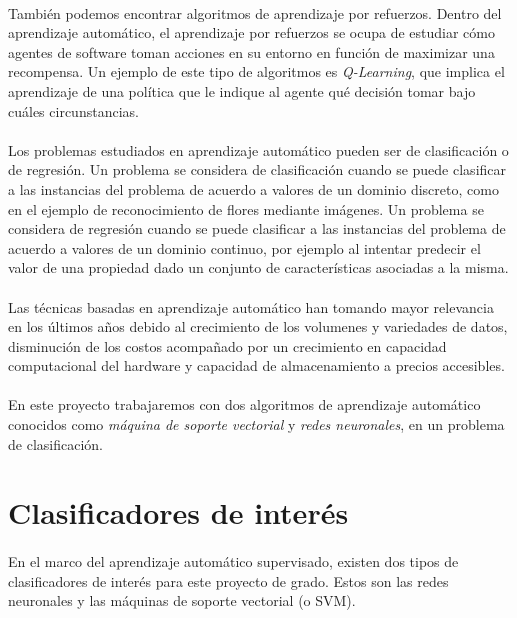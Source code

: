 \paragraph{}También podemos encontrar algoritmos de aprendizaje por refuerzos. Dentro del aprendizaje automático, el aprendizaje por refuerzos se ocupa de estudiar cómo agentes de software toman acciones en su entorno en función de maximizar una recompensa. Un ejemplo de este tipo de algoritmos es \textit{Q-Learning}, que implica el aprendizaje de una política que le indique al agente qué decisión tomar bajo cuáles circunstancias.

\paragraph{}Los problemas estudiados en aprendizaje automático pueden ser de clasificación o de regresión. Un problema se considera de clasificación cuando se puede clasificar a las instancias del problema de acuerdo a valores de un dominio discreto, como en el ejemplo de reconocimiento de flores mediante imágenes. Un problema se considera de regresión cuando se puede clasificar a las instancias del problema de acuerdo a valores de un dominio continuo, por ejemplo al intentar predecir el valor de una propiedad dado un conjunto de características asociadas a la misma.

\paragraph{}Las técnicas basadas en aprendizaje automático han tomando mayor relevancia en los últimos años debido al crecimiento de los volumenes y variedades de datos, disminución de los costos acompañado por un crecimiento en capacidad computacional del hardware y capacidad de almacenamiento a precios accesibles. 

\paragraph{}En este proyecto trabajaremos con dos algoritmos de aprendizaje automático conocidos como \textit{máquina de soporte vectorial} y \textit{redes neuronales}, en un problema de clasificación.

\section{Clasificadores de interés}

\paragraph{}En el marco del aprendizaje automático supervisado, existen dos tipos de clasificadores de interés para este proyecto de grado. Estos son las redes neuronales y las máquinas de soporte vectorial (o SVM).





